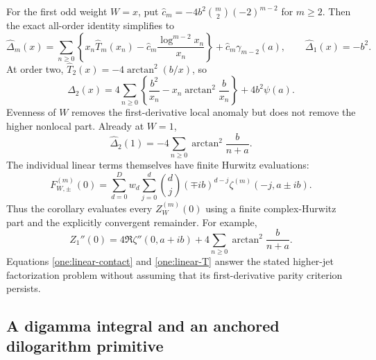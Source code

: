 For the first odd weight $W=x$, put
$\widehat c_m=-4b^2\binom m2(-2)^{m-2}$ for $m\ge2$.
Then the exact all-order identity simplifies to
\begin{equation}\label{one:linear-isolate}
 \widehat\Delta_m(x)=\sum_{n\ge0}\left\{
 x_n\widehat T_m(x_n)-\widehat c_m
                         \frac{\log^{m-2}x_n}{x_n}\right\}
                         +\widehat c_m\gamma_{m-2}(a),
 \qquad \widehat\Delta_1(x)=-b^2.
\end{equation}
At order two, $\widehat T_2(x)=-4\arctan^2(b/x)$, so
\begin{equation}\label{one:linear-second}
 \boxed{\displaystyle
 \widehat\Delta_2(x)=
 4\sum_{n\ge0}\left\{\frac{b^2}{x_n}
                       -x_n\arctan^2\frac b{x_n}\right\}
                                      +4b^2\psi(a).}
\end{equation}
Evenness of $W$ removes the first-derivative local anomaly but does
not remove the higher nonlocal part.  Already at $W=1$,
\[
 \widehat\Delta_2(1)=-4\sum_{n\ge0}\arctan^2\frac b{n+a}.
\]
The individual linear terms themselves have finite Hurwitz evaluations:
\begin{equation}\label{one:linear-hurwitz}
 F_{W,\pm}^{(m)}(0)=
 \sum_{d=0}^D w_d\sum_{j=0}^d\binom dj
       (\mp ib)^{d-j}\zeta^{(m)}(-j,a\pm ib).
\end{equation}
Thus the corollary evaluates every $Z_W^{(m)}(0)$ using a finite
complex-Hurwitz part and the explicitly convergent remainder.
For example,
\begin{equation}\label{one:linear-unweighted}
 Z_1''(0)=4\Re\zeta''(0,a+ib)
                     +4\sum_{n\ge0}\arctan^2\frac b{n+a}.
\end{equation}
Equations \eqref{one:linear-contact} and \eqref{one:linear-T}
answer the stated higher-jet factorization problem without assuming that
its first-derivative parity criterion persists.

\subsection{A digamma integral and an anchored dilogarithm primitive}

